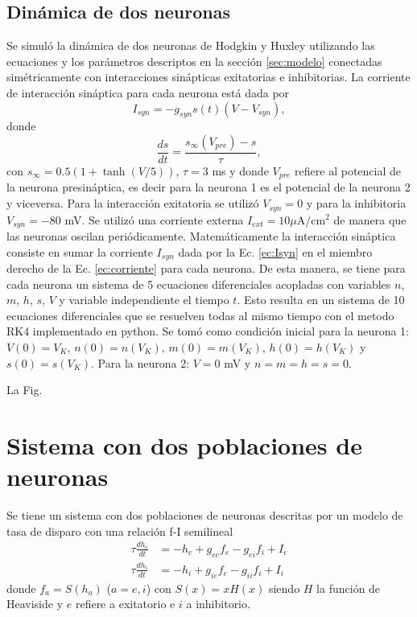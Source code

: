 \documentclass[11pt,twocolumn,twoside]{opticajnl}
\begin{document}
\subsection{Dinámica de dos neuronas}

Se simuló la dinámica de dos neuronas de Hodgkin y Huxley utilizando las ecuaciones y los parámetros descriptos en la sección \ref{sec:modelo} conectadas simétricamente con interacciones sinápticas exitatorias e inhibitorias. La corriente de interacción sináptica para cada neurona está dada por 
\begin{equation}
    I_{syn} = -g_{syn} s(t) (V-V_{syn}),
    \label{ec:Isyn}
\end{equation}
donde
\begin{equation}
    \frac{ds}{dt} = \frac{s_{\infty}(V_{pre}) - s}{\tau},
\end{equation}
con $s_{\infty} = 0.5 (1 + \tanh(V/5))$, $\tau = 3$ ms y donde $V_{pre}$ refiere al potencial de la neurona presináptica, es decir para la neurona 1 es el potencial de la neurona 2 y viceversa. Para la interacción exitatoria se utilizó $V_{syn}= 0$ y para la inhibitoria $V_{syn} = -80$ mV. Se utilizó una corriente externa $I_{ext} = 10 \mu\text{A}/\text{cm}^2$ de manera que las neuronas oscilan periódicamente. Matemáticamente la interacción sináptica consiste en sumar la corriente $I_{syn}$ dada por la Ec. \ref{ec:Isyn} en el miembro derecho de la Ec. \ref{ec:corriente} para cada neurona. De esta manera, se tiene para cada neurona un sistema de 5 ecuaciones diferenciales acopladas con variables $n$, $m$, $h$, $s$, $V$ y variable independiente el tiempo $t$. Esto resulta en un sistema de 10 ecuaciones diferenciales que se resuelven todas al mismo tiempo con el metodo RK4 implementado en python. Se tomó como condición inicial para la neurona 1: $V(0) = V_K$, $n(0) = n(V_K)$, $m(0) = m(V_K)$, $h(0) = h(V_K)$ y $s(0) = s(V_K)$. Para la neurona 2: $V=0$ mV y $n=m=h=s=0$.

La Fig. 







\section{Sistema con dos poblaciones de neuronas \label{sec:p1}}

Se tiene un sistema con dos poblaciones de neuronas descritas por un modelo de tasa de disparo con una relación f-I semilineal
\begin{align}
    \tau \frac{d h_e}{dt} &= -h_e + g_{ee}f_e - g_{ei}f_i + I_e \\
    \tau \frac{d h_i}{dt} &= -h_i + g_{ie}f_e - g_{ii}f_i + I_i
    \label{ec:sistema}
\end{align}
donde $f_a = S(h_a)$ ($a=e,i$) con $S(x) = x H(x) $ siendo $H$ la función de Heaviside y $e$ refiere a exitatorio e $i$ a inhibitorio. 
\end{document}
